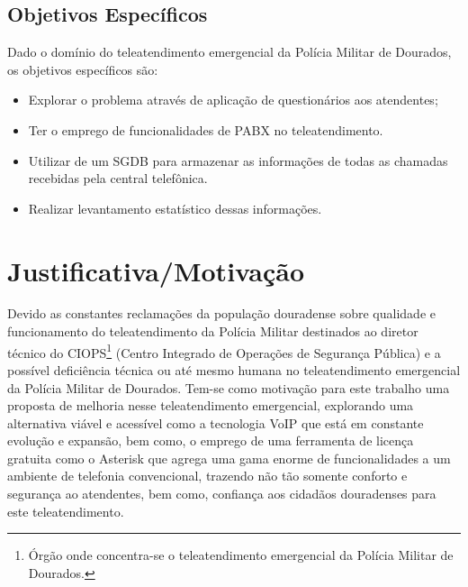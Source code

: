 \subsection{Objetivos Específicos}
Dado o domínio do teleatendimento emergencial da Polícia Militar de Dourados, os objetivos específicos são:

\begin{itemize}
	\item Explorar o problema através de aplicação de questionários aos atendentes;
	\item Ter o emprego de funcionalidades de PABX no teleatendimento.
	\item Utilizar de um SGDB para armazenar as informações de todas as chamadas recebidas pela central telefônica.
	\item Realizar levantamento estatístico dessas informações.
\end{itemize}

\section{Justificativa/Motivação}
Devido as constantes reclamações da população douradense sobre qualidade e funcionamento do teleatendimento da Polícia Militar destinados ao diretor técnico do CIOPS\footnote{Órgão onde concentra-se o teleatendimento emergencial da Polícia Militar de Dourados.} (Centro Integrado de Operações de Segurança Pública) e a possível deficiência técnica ou até mesmo humana no teleatendimento emergencial da Polícia Militar de Dourados. Tem-se como motivação para este trabalho uma proposta de melhoria nesse teleatendimento emergencial, explorando uma alternativa viável e acessível como a tecnologia VoIP que está em constante evolução e expansão, bem como, o emprego de uma ferramenta de licença gratuita como o Asterisk que agrega uma gama enorme de funcionalidades a um ambiente de telefonia convencional, trazendo não tão somente conforto e segurança ao atendentes, bem como, confiança aos cidadãos douradenses para este teleatendimento.

